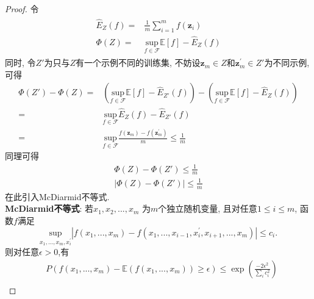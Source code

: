 \begin{proof}
令
\begin{eqnarray}
\begin{aligned}
\hat{E}_Z\left( f \right) =& \frac{1}{m}\sum_{i=1}^m{f\left( \boldsymbol{z}_i \right)} \\
\Phi \left( Z \right) =& \underset{f\in \mathcal{F}}{\text{sup}}\mathbb{E}\left[ f \right] -\hat{E}_Z\left( f \right)
\end{aligned}
\end{eqnarray}
同时, 令$Z'$为只与$Z$有一个示例不同的训练集, 不妨设$\mathbf{z}_m\in Z$和$\mathbf{z}_{m}^{'}\in Z'$为不同示例, 可得\\
\begin{equation}
\begin{aligned}
\Phi \left( Z' \right) -\Phi \left( Z \right) =&\left( \underset{f\in \mathcal{F}}{\text{sup}}\mathbb{E}\left[ f \right] -\hat{E}_{Z'}\left( f \right) \right) -\left( \underset{f\in \mathcal{F}}{\text{sup}}\mathbb{E}\left[ f \right] -\hat{E}_Z\left( f \right) \right) \\
=&\underset{f\in \mathcal{F}}{\text{sup}}\hat{E}_Z\left( f \right) -\hat{E}_{Z'}\left( f \right)  \\
=&\underset{f\in \mathcal{F}}{\text{sup}}\frac{f\left( \boldsymbol{z}_m \right) -f\left( \boldsymbol{z}_{m}^{'} \right)}{m}\le \frac{1}{m}
\end{aligned}
\end{equation}
同理可得
\begin{eqnarray}
\Phi \left( Z \right) -\Phi \left( Z' \right) \le \frac{1}{m} \\
\left| \Phi \left( Z \right) -\Phi \left( Z' \right) \right|\le \frac{1}{m}
\end{eqnarray}
在此引入McDiarmid不等式. \\
\textcolor[rgb]{0.5,0.3,0.2}{\textbf{McDiarmid不等式}: 若$x_1,x_2,...,x_m$ 为$m$个独立随机变量, 且对任意$1\le i\le m$, 函数$f$满足
\begin{equation}
\underset{x_1,...,x_m,x_{i}^{'}}{\text{sup}}\left| f\left( x_1,...,x_m \right) -f\left( x_1,...,x_{i-1},x_{i}^{'},x_{i+1},...,x_m \right) \right|\le c_i.
\end{equation}}
\textcolor[rgb]{0.5,0.3,0.2}{则对任意$\epsilon >0$,有
\begin{eqnarray}
&P\left( f\left( x_1,...,x_m \right) -\mathbb{E}\left( f\left( x_1,...,x_m \right) \right) \ge \epsilon \right) \le \exp \left( \frac{-2\epsilon ^2}{\sum\limits_i^{}{c_{i}^{2}}} \right) \\

\end{eqnarray}}
\end{proof}
